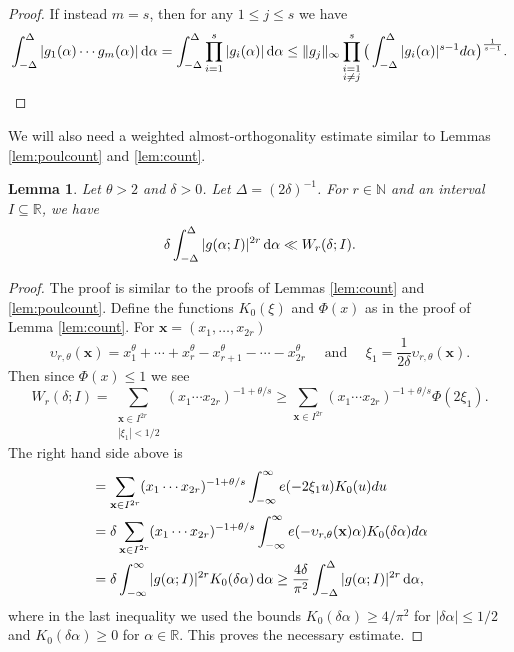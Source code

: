 \documentclass[11pt,reqno]{amsart}
\numberwithin{equation}{section}
\newtheorem{lemma}{Lemma}[section]
\renewcommand{\d}{\,{\rm d}}
\begin{document}
\begin{proof}
If instead $m = s$, then for any $1 \leq j \leq s$ we have 
\[ \int_{-\Delta}^{\Delta}|g_1(\alpha)\cdots g_m(\alpha)|\d\alpha = \int_{-\Delta}^{\Delta} \prod_{i=1}^s |g_i(\alpha)| \d\alpha \leq \| g_j \|_{\infty} \prod_{\substack{i = 1 \\ i \neq j}}^s \big( \int_{-\Delta}^{\Delta} |g_i(\alpha)|^{s-1}d\alpha \big)^{\frac{1}{s-1}}. \]
\end{proof} 

We will also need a weighted almost-orthogonality estimate similar to Lemmas \ref{lem:poulcount} and \ref{lem:count}. 

\begin{lemma} \label{lem:symcount}
Let $\theta > 2$ and $\delta > 0$. Let $\Delta = (2\delta)^{-1}$. For $r \in \mathbb{N}$ and an interval $I \subseteq \mathbb{R}$, we have 
\[ \delta \int_{-\Delta}^{\Delta} |g(\alpha;I)|^{2r}\d\alpha \ll W_r(\delta;I). \]
\end{lemma}

\begin{proof} The proof is similar to the proofs of Lemmas \ref{lem:count} and \ref{lem:poulcount}. Define the functions $K_0(\xi)$ and $\Phi(x)$ as in the proof of Lemma \ref{lem:count}. For $\mathbf{x} = (x_1,\ldots,x_{2r})$
\[ \upsilon_{r,\theta}(\mathbf{x}) = x_1^{\theta}+\cdots+x_r^{\theta}-x_{r+1}^{\theta}-\cdots-x_{2r}^{\theta} \quad \text{ and } \quad \xi_1 = \frac{1}{2\delta}\upsilon_{r,\theta}(\mathbf{x}). \]
Then since $\Phi(x) \leq 1$ we see 
\[ W_r(\delta;I) = \sum_{\substack{\mathbf{x} \in I^{2r} \\ |\xi_1| < 1/2 }} (x_1\cdots x_{2r})^{-1+\theta/s} \geq \sum_{\mathbf{x} \in I^{2r}} (x_1\cdots x_{2r})^{-1+\theta/s}  \Phi(2\xi_1). \] 
The right hand side above is 
\begin{align*} & = \sum_{\mathbf{x} \in I^{2r}} (x_1\cdots x_{2r})^{-1+\theta/s}  \int_{-\infty}^{\infty} e(-2\xi_1u)K_0(u)du 
\\ & = \delta \sum_{\mathbf{x} \in I^{2r}} (x_1\cdots x_{2r})^{-1+\theta/s} \int_{-\infty}^{\infty} e(-\upsilon_{r,\theta}(\mathbf{x})\alpha)K_0(\delta \alpha)d\alpha 
\\ & = \delta \int_{-\infty}^{\infty} |g(\alpha;I)|^{2r}K_0(\delta \alpha)\d\alpha \geq \frac{4\delta}{\pi^2}\int_{-\Delta}^{\Delta} |g(\alpha;I)|^{2r} \d\alpha,
\end{align*}
where in the last inequality we used the bounds $K_0(\delta \alpha) \geq 4/\pi^2$ for $|\delta \alpha| \leq 1/2$ and $K_0(\delta \alpha) \geq 0$ for $\alpha \in \mathbb{R}$. This proves the necessary estimate. 
\end{proof}
\end{document}
